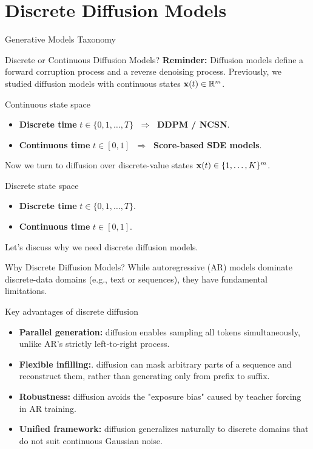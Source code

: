 \documentclass{beamer}
\begin{document}
\section{Discrete Diffusion Models}
\begin{frame}{Generative Models Taxonomy}
\end{frame}
\begin{frame}{Discrete or Continuous Diffusion Models?}
	\textbf{Reminder:} Diffusion models define a forward corruption process and a reverse denoising process.
	Previously, we studied diffusion models with continuous states $\mathbf{x}(t) \in \mathbb{R}^m$.
	\begin{block}{Continuous state space}
		\begin{itemize}
			\item \textbf{Discrete time} $t \in \{0,1,\ldots,T\}$ $\;\Rightarrow\;$ \textbf{DDPM / NCSN}.
			\item \textbf{Continuous time} $t \in [0,1]$ $\;\Rightarrow\;$ \textbf{Score-based SDE models}.
		\end{itemize}
	\end{block}
	\eqpause
	Now we turn to diffusion over discrete-value states $\mathbf{x}(t) \in \{1, \dots, K\}^m$.
	\begin{block}{Discrete state space}
		\begin{itemize}
			\item \textbf{Discrete time} $t \in \{0,1,\ldots,T\}$.
			\item \textbf{Continuous time} $t \in [0,1]$.
		\end{itemize}
	\end{block}
	Let's discuss why we need discrete diffusion models.
\end{frame}
\begin{frame}{Why Discrete Diffusion Models?}
	While autoregressive (AR) models dominate discrete-data domains (e.g., text or sequences), they have fundamental limitations.
	\eqpause
	\begin{block}{Key advantages of discrete diffusion}
		\begin{itemize}
			\item \textbf{Parallel generation:} diffusion enables sampling all tokens simultaneously, unlike AR’s strictly left-to-right process. 
			\eqpause
			\item \textbf{Flexible infilling:}. diffusion can mask arbitrary parts of a sequence and reconstruct them, rather than generating only from prefix to suffix.
			\eqpause 
			\item \textbf{Robustness:} diffusion avoids the "exposure bias" caused by teacher forcing in AR training.
			\eqpause
			\item \textbf{Unified framework:} diffusion generalizes naturally to discrete domains that do not suit continuous Gaussian noise.
		\end{itemize}
	\end{block}
\end{frame}
\end{document}
